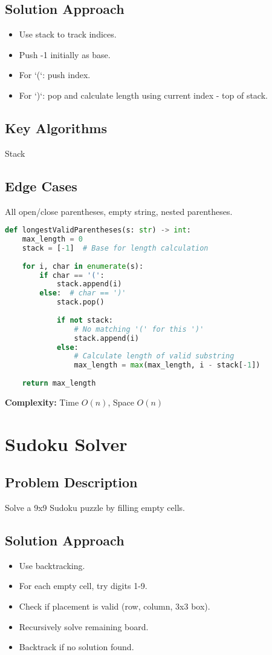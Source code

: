 \documentclass[10pt, a4paper]{article}
\begin{document}
\subsection*{Solution Approach}
\begin{itemize}
    \item Use stack to track indices.
    \item Push -1 initially as base.
    \item For `(`: push index.
    \item For `)`: pop and calculate length using current index - top of stack.
\end{itemize}

\subsection*{Key Algorithms}
Stack

\subsection*{Edge Cases}
All open/close parentheses, empty string, nested parentheses.

\begin{lstlisting}[language=Python]
def longestValidParentheses(s: str) -> int:
    max_length = 0
    stack = [-1]  # Base for length calculation
    
    for i, char in enumerate(s):
        if char == '(':
            stack.append(i)
        else:  # char == ')'
            stack.pop()
            
            if not stack:
                # No matching '(' for this ')'
                stack.append(i)
            else:
                # Calculate length of valid substring
                max_length = max(max_length, i - stack[-1])
    
    return max_length
\end{lstlisting}
\textbf{Complexity:} Time $O(n)$, Space $O(n)$

\section{Sudoku Solver}
\subsection*{Problem Description}
Solve a 9x9 Sudoku puzzle by filling empty cells.

\subsection*{Solution Approach}
\begin{itemize}
    \item Use backtracking.
    \item For each empty cell, try digits 1-9.
    \item Check if placement is valid (row, column, 3x3 box).
    \item Recursively solve remaining board.
    \item Backtrack if no solution found.
\end{itemize}
\end{document}
